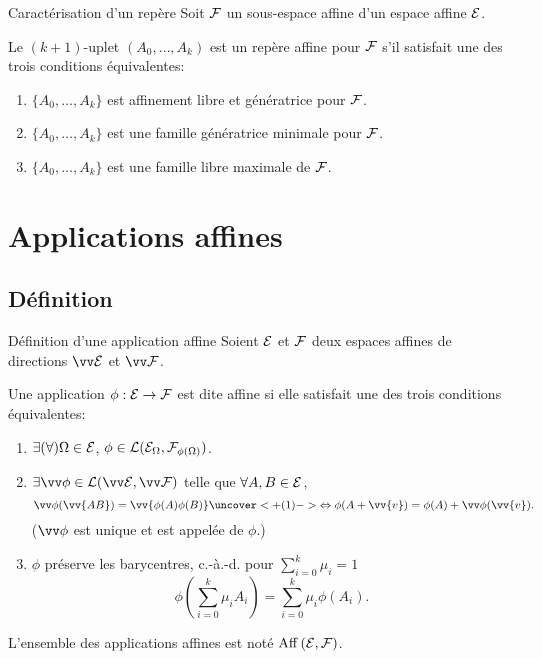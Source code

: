 \documentclass{m53beamer}
\begin{document}
  \begin{frame}{Caractérisation d'un repère}
    Soit $\mathcal{F}$ un sous-espace affine d'un espace affine $\mathcal{E}$.
    \begin{proposition}
      Le $(k+1)$-uplet $(A_{0},\ldots,A_{k})$ est un repère affine pour $\mathcal{F}$ s'il satisfait une des trois conditions équivalentes:
      \begin{enumerate}[<+(1)->]
        \item $\{A_{0},\ldots,A_{k}\}$ est affinement libre et génératrice pour $\mathcal{F}$.
        \item $\{A_{0},\ldots,A_{k}\}$ est une famille génératrice minimale pour $\mathcal{F}$.
        \item $\{A_{0},\ldots,A_{k}\}$ est une famille libre maximale de $\mathcal{F}$.
      \end{enumerate}
    \end{proposition}
  \end{frame}
\section{Applications affines}
\subsection{Définition}
  \begin{frame}{Définition d'une application affine}
    Soient $\mathcal{E}$ et $\mathcal{F}$ deux espaces affines de directions $\ev{E}$ et $\ev{F}$.
    \begin{defprop}
      Une application $\phi:\mathcal{E}\rightarrow\mathcal{F}$ est dite \alert{affine} si elle satisfait une des trois conditions équivalentes:
      \begin{enumerate}[<+(1)->]
        \item $\exists(\forall) \Omega \in \mathcal{E}$, $\phi\in\operatorname{\mathcal{L}}(\mathcal{E}_{\Omega},\mathcal{F}_{\phi(\Omega)})$.
        \item $\exists \vv\phi \in \lin(\ev{E},\ev{F})$ telle que $\forall A,B \in \mathcal{E}$,
          $$
            \vv\phi(\vv{AB})=\vv{\phi(A)\phi(B)} \uncover<+(1)->{\Leftrightarrow \phi(A+\vv{v})=\phi(A)+\vv\phi(\vv{v}).}
          $$
        ($\vv\phi$ est unique et est appelée  de $\phi$.)
        \item $\phi$ préserve les barycentres, c.-à.-d. pour $\sum_{i=0}^{k}\mu_{i}=1$
          $$
            \phi(\sum_{i=0}^{k}\mu_{i}A_{i})=\sum_{i=0}^{k}\mu_{i}\phi(A_{i}).
          $$
      \end{enumerate}\pause
      L'ensemble des applications affines est noté $\operatorname{Aff}\left(\mathcal{E},\mathcal{F}\right)$.
    \end{defprop}
  \end{frame}
\end{document}
